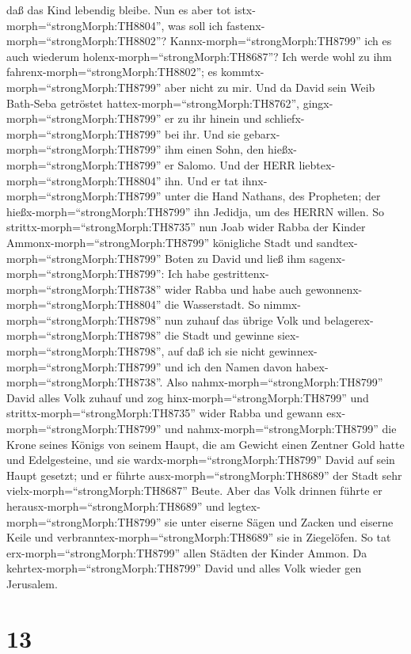 daß das Kind lebendig bleibe.  Nun es aber tot
istx-morph=``strongMorph:TH8804'', was soll ich
fastenx-morph=``strongMorph:TH8802''? Kannx-morph=``strongMorph:TH8799''
ich es auch wiederum holenx-morph=``strongMorph:TH8687''? Ich werde wohl
zu ihm fahrenx-morph=``strongMorph:TH8802''; es
kommtx-morph=``strongMorph:TH8799'' aber nicht zu mir.  Und
da David sein Weib Bath-Seba getröstet
hattex-morph=``strongMorph:TH8762'', gingx-morph=``strongMorph:TH8799''
er zu ihr hinein und schliefx-morph=``strongMorph:TH8799'' bei ihr. Und
sie gebarx-morph=``strongMorph:TH8799'' ihm einen Sohn, den
hießx-morph=``strongMorph:TH8799'' er Salomo. Und der HERR
liebtex-morph=``strongMorph:TH8804'' ihn.  Und er tat
ihnx-morph=``strongMorph:TH8799'' unter die Hand Nathans, des Propheten;
der hießx-morph=``strongMorph:TH8799'' ihn Jedidja, um des HERRN willen.
 So strittx-morph=``strongMorph:TH8735'' nun Joab wider
Rabba der Kinder Ammonx-morph=``strongMorph:TH8799'' königliche Stadt
 und sandtex-morph=``strongMorph:TH8799'' Boten zu David
und ließ ihm sagenx-morph=``strongMorph:TH8799'': Ich habe
gestrittenx-morph=``strongMorph:TH8738'' wider Rabba und habe auch
gewonnenx-morph=``strongMorph:TH8804'' die Wasserstadt.  So
nimmx-morph=``strongMorph:TH8798'' nun zuhauf das übrige Volk und
belagerex-morph=``strongMorph:TH8798'' die Stadt und gewinne
siex-morph=``strongMorph:TH8798'', auf daß ich sie nicht
gewinnex-morph=``strongMorph:TH8799'' und ich den Namen davon
habex-morph=``strongMorph:TH8738''.  Also
nahmx-morph=``strongMorph:TH8799'' David alles Volk zuhauf und zog
hinx-morph=``strongMorph:TH8799'' und
strittx-morph=``strongMorph:TH8735'' wider Rabba und gewann
esx-morph=``strongMorph:TH8799''  und
nahmx-morph=``strongMorph:TH8799'' die Krone seines Königs von seinem
Haupt, die am Gewicht einen Zentner Gold hatte und Edelgesteine, und sie
wardx-morph=``strongMorph:TH8799'' David auf sein Haupt gesetzt; und er
führte ausx-morph=``strongMorph:TH8689'' der Stadt sehr
vielx-morph=``strongMorph:TH8687'' Beute.  Aber das Volk
drinnen führte er herausx-morph=``strongMorph:TH8689'' und
legtex-morph=``strongMorph:TH8799'' sie unter eiserne Sägen und Zacken
und eiserne Keile und verbranntex-morph=``strongMorph:TH8689'' sie in
Ziegelöfen. So tat erx-morph=``strongMorph:TH8799'' allen Städten der
Kinder Ammon. Da kehrtex-morph=``strongMorph:TH8799'' David und alles
Volk wieder gen Jerusalem.

\hypertarget{section-12}{%
\section{13}\label{section-12}}

